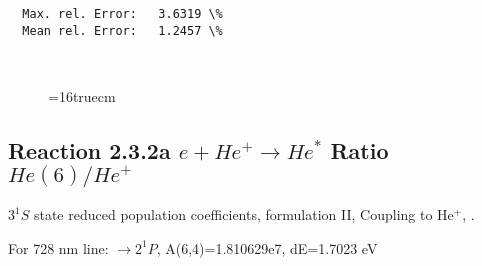 \documentclass[12pt,dvipdfmx]{article}
\begin{document}
\begin{small}
\begin{verbatim}
  Max. rel. Error:   3.6319 \%
  Mean rel. Error:   1.2457 \%



\end{verbatim}\end{small}
\begin{figure} \label{2.2e}
\epsfxsize=16truecm
\end{figure}
\newpage


\subsection{
  Reaction 2.3.2a $e + He^+ \rightarrow He^*  $ Ratio $He(6)/He^+$
}

  $3^1S$ state
  reduced population coefficients, formulation II,
  Coupling to He$^+$, \cite{kn:Fujimoto}.

  For 728 nm line:  $\rightarrow 2^1P$, A(6,4)=1.810629e7, dE=1.7023 eV
\end{document}
